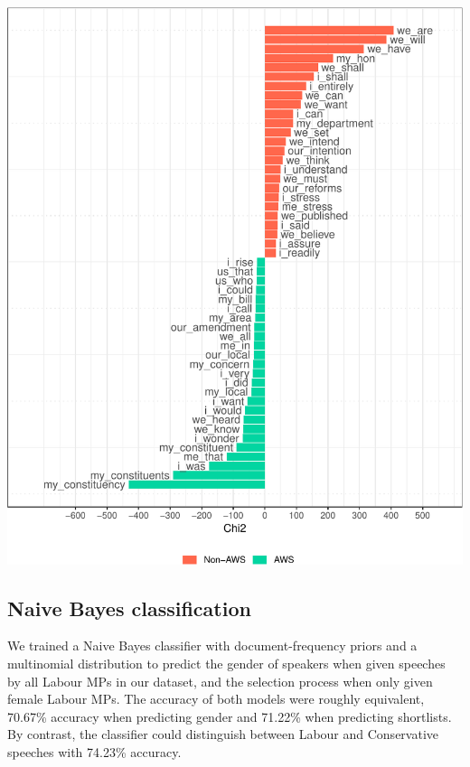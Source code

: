 \documentclass[]{article}
\let\origfigure\figure
\let\endorigfigure\endfigure
\renewenvironment{figure}[1][2] {
    \expandafter\origfigure\expandafter[H]
} {
    \endorigfigure
}
\theoremstyle{definition}
\theoremstyle{definition}
\theoremstyle{definition}
\theoremstyle{remark}
\begin{document}
\begin{figure}
\centering
\includegraphics{methodology_files/figure-latex/bigrams-sl-keyness-1.pdf}
\caption{\label{fig:bigrams-sl-keyness}Bigram Keyness in Female Labour MPs
by Selection Process}
\end{figure}

\hypertarget{naive-bayes-classification}{%
\subsection{Naive Bayes
classification}\label{naive-bayes-classification}}

We trained a Naive Bayes classifier with document-frequency priors and a
multinomial distribution to predict the gender of speakers when given
speeches by all Labour MPs in our dataset, and the selection process
when only given female Labour MPs. The accuracy of both models were
roughly equivalent, 70.67\% accuracy when predicting gender and 71.22\%
when predicting shortlists. By contrast, the classifier could
distinguish between Labour and Conservative speeches with 74.23\%
accuracy.
\end{document}
